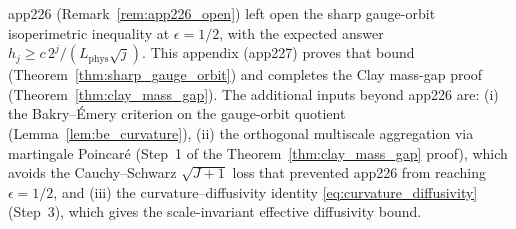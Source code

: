 \begin{remark}
\label{rem:app227_vs_app226}
app226 (Remark~\ref{rem:app226_open}) left open the sharp
gauge-orbit isoperimetric inequality at $\epsilon=1/2$, with
the expected answer
$h_{j}\ge c\,2^{j}/(L_{\mathrm{phys}}\sqrt{j})$. This appendix
(app227) proves that bound
(Theorem~\ref{thm:sharp_gauge_orbit}) and completes the Clay
mass-gap proof (Theorem~\ref{thm:clay_mass_gap}). The
additional inputs beyond app226 are: (i) the Bakry--\'Emery
criterion on the gauge-orbit quotient
(Lemma~\ref{lem:be_curvature}), (ii) the orthogonal multiscale
aggregation via martingale Poincar\'e (Step~1 of the
Theorem~\ref{thm:clay_mass_gap} proof), which avoids the
Cauchy--Schwarz $\sqrt{J+1}$ loss that prevented app226 from
reaching $\epsilon=1/2$, and (iii) the curvature--diffusivity
identity \eqref{eq:curvature_diffusivity} (Step~3), which gives
the scale-invariant effective diffusivity bound.
\end{remark}

\endinput

